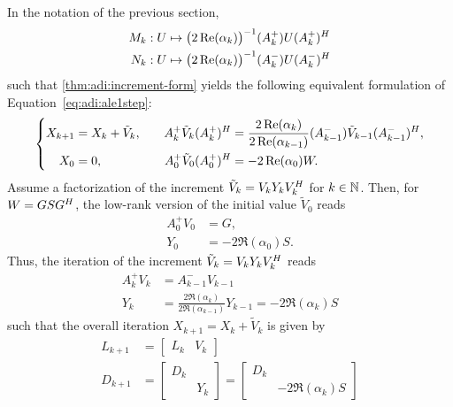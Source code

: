 \pagebreak

In the notation of the previous section,
\begin{equation}
\label{eq:adi:ale:MN}
\begin{aligned}
  M_k &: U \mapsto \big( 2\operatorname{Re}(\alpha_k) \big)^{-1} (A_k^+) U (A_k^+)^H \\
  N_k &: U \mapsto \big( 2\operatorname{Re}(\alpha_k) \big)^{-1} (A_k^-) U (A_k^-)^H
\end{aligned}
\end{equation}
such that \autoref{thm:adi:increment-form} yields the following equivalent formulation of Equation~\eqref{eq:adi:ale1step}:
\begin{equation}
\left\{
\begin{aligned}
  X_{k+1}
    &= X_k + \tilde V_k, &
  \quad %
  A_k^+ \tilde V_k (A_k^+)^\HT
    &= \frac{2\Re(\alpha_k)}{2\Re(\alpha_{k-1})}
      (A_{k-1}^-) \tilde V_{k-1} (A_{k-1}^-)^\HT
  ,\\
  X_0
    &= 0, &
  A_0^+ \tilde V_0 (A_0^+)^\HT
    &= -2\Re(\alpha_0) W
  .
\end{aligned}
\right.
\end{equation}
Assume a factorization of the increment $\tilde V_k = V_k Y_k V_k^H$ for $k\in\mathbb{N}$.
Then, for $W = GSG^H$,
the low-rank version of the initial value $\tilde V_0$ reads
\begin{equation}
\begin{aligned}
  A_0^+ V_0 &= G, \\
  Y_0 &= -2\Re(\alpha_0) S.
\end{aligned}
\end{equation}
Thus,
the iteration of the increment $\tilde V_{k} = V_k Y_k V_k^H$ reads
\begin{equation}
\begin{aligned}
  A_k^+ V_k &= A_{k-1}^- V_{k-1} \\
  Y_k &= \frac{2\Re(\alpha_k)}{2\Re(\alpha_{k-1})} Y_{k-1}
  = -2\Re(\alpha_k) S
\end{aligned}
\end{equation}
such that the overall iteration $X_{k+1} = X_k + \tilde V_k$ is given by
\begin{equation}
\begin{aligned}
  L_{k+1} &= \begin{bmatrix}
    L_k &
    V_k
  \end{bmatrix} \\
    D_{k+1} &= \begin{bmatrix}
      D_k \\
      & Y_k
    \end{bmatrix}
    = \begin{bmatrix}
      D_k \\
      & -2\Re(\alpha_k) S
    \end{bmatrix}
\end{aligned}
\end{equation}

